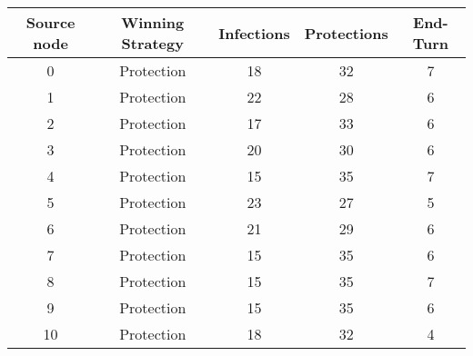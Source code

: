 \documentclass[results.tex]{subfiles}
\begin{document}
    \begin{center}
        \begin{tabular}{| c || c | c | c | c |}
            \hline
            {\bfseries Source node} & {\bfseries Winning Strategy} & {\bfseries Infections} & {\bfseries Protections}
            & {\bfseries End-Turn}
            \\  %
            \hline\hline
            0                       & Protection                   & 18                     & 32                      & 7                    \\
            \hline
            1                       & Protection                   & 22                     & 28                      & 6                    \\
            \hline
            2                       & Protection                   & 17                     & 33                      & 6                    \\
            \hline
            3                       & Protection                   & 20                     & 30                      & 6                    \\
            \hline
            4                       & Protection                   & 15                     & 35                      & 7                    \\
            \hline
            5                       & Protection                   & 23                     & 27                      & 5                    \\
            \hline
            6                       & Protection                   & 21                     & 29                      & 6                    \\
            \hline
            7                       & Protection                   & 15                     & 35                      & 6                    \\
            \hline
            8                       & Protection                   & 15                     & 35                      & 7                    \\
            \hline
            9                       & Protection                   & 15                     & 35                      & 6                    \\
            \hline
            10                      & Protection                   & 18                     & 32                      & 4                    \\

\end{tabular}
\end{center}
\end{document}
